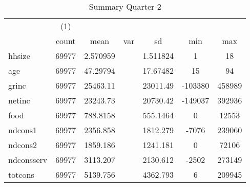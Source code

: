 \begin{table}[htbp]\centering
\def\sym#1{\ifmmode^{#1}\else\(^{#1}\)\fi}
\caption{Summary Quarter 2 \label{sum\_Q2}}
\begin{tabular}{l*{1}{cccccc}}
\hline\hline
            &\multicolumn{1}{c}{(1)}&            &            &            &            &            \\
            &       count&        mean&         var&          sd&         min&         max\\
\hline
hhsize      &       69977&    2.570959&            &    1.511824&           1&          18\\
age         &       69977&    47.29794&            &    17.67482&          15&          94\\
grinc       &       69977&    25463.11&            &    23011.49&     -103380&      458989\\
netinc      &       69977&    23243.73&            &    20730.42&     -149037&      392936\\
food        &       69977&    788.8158&            &    555.1464&           0&       12553\\
ndcons1     &       69977&    2356.858&            &    1812.279&       -7076&      239060\\
ndcons2     &       69977&    1859.186&            &    1241.181&           0&       72106\\
ndconsserv  &       69977&    3113.207&            &    2130.612&       -2502&      273149\\
totcons     &       69977&    5139.756&            &    4362.793&           6&      209945\\
\hline\hline
\end{tabular}
\end{table}
